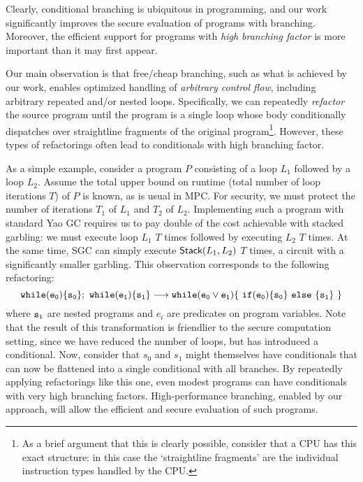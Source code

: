Clearly, conditional branching is ubiquitous in programming, and our work significantly
improves the secure evaluation of programs with
branching.
Moreover, the efficient support for programs with \emph{high branching factor}
is more important than it may first appear.

Our main observation is that free/cheap branching, such as what is
achieved by our work, enables optimized handling of \emph{arbitrary
control flow}, including arbitrary repeated and/or nested loops.
%
Specifically, we can repeatedly \emph{refactor} the source program
until the program is a single loop whose body conditionally dispatches
over straightline fragments of the original program\footnote{%
  As a brief argument that this is clearly possible, consider that a
  CPU has this exact structure: in this case the `straightline
  fragments' are the individual instruction types handled by the CPU.
}.
However, these types of refactorings often lead to conditionals with
high branching factor.

As a simple example,
consider a program $P$ consisting of a loop $L_1$ followed by a loop
$L_2$.  Assume the total upper bound on runtime (total number of loop
iterations $T$) of $P$ is known, as is usual in MPC.
For security, we must protect the number of iterations $T_1$ of $L_1$
and $T_2$ of $L_2$.
Implementing such a program with standard Yao GC requires us to
pay double of the cost achievable with stacked garbling: we must
execute loop $L_1$ $T$ times followed by executing $L_2$ $T$ times.
At the same time, SGC can simply execute  $\textsf{Stack}(L_1, L_2)$ $T$
times, a circuit with a significantly smaller garbling. This observation corresponds to the
following refactoring:
\[{\tt while (e_0) \{ s_0 \} ; \ while (e_1) \{ s_1 \}}
\longrightarrow {\tt while (e_0 \lor e_1) \{\ if  (e_0) \{s_0\}\  else\  \{s_1\}\ \}} \]
where ${\tt s_i}$ are nested programs and $e_i$ are predicates on program
variables.
Note that the result of this transformation is friendlier to the
secure computation setting, since we have reduced the number of loops,
but has introduced a conditional.
Now, consider that $s_0$ and $s_1$ might themselves have conditionals
that can now be flattened into a single conditional with all branches.
By repeatedly applying refactorings like this one, even modest
programs can have conditionals with very high branching factors.
High-performance branching, enabled by our approach, will allow the
efficient and secure evaluation of such programs.


